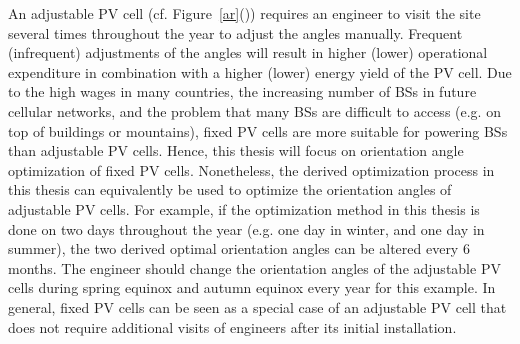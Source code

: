 An adjustable PV cell (cf. \mbox{Figure \ref{ar}()}) requires an engineer to visit the site several times throughout the year to adjust the angles manually. Frequent (infrequent) adjustments of the angles will result in higher (lower) operational expenditure in combination with a higher (lower) energy yield of the PV cell. Due to the high wages in many countries, the increasing number of BSs in future cellular networks, and the problem that many BSs are difficult to access (e.g. on top of buildings or mountains), fixed PV cells are more suitable for powering BSs than adjustable PV cells. Hence, this thesis will focus on orientation angle optimization of fixed PV cells. Nonetheless, the derived optimization process in this thesis can equivalently be used to optimize the orientation angles of adjustable PV cells. For example, if the optimization method in this thesis is done on two days throughout the year (e.g. one day in winter, and one day in summer), the two derived optimal orientation angles can be altered every 6 months. The engineer should change the orientation angles of the adjustable PV cells during spring equinox and autumn equinox every year for this example. In general, fixed PV cells can be seen as a special case of an adjustable PV cell that does not require additional visits of engineers after its initial installation.





